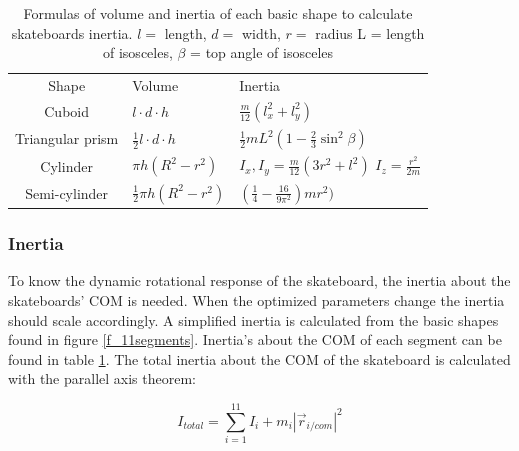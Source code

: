 \begin{table}
\begin{center}
\caption[Inertia]{Formulas of volume and inertia of each basic shape to calculate skateboards inertia. $l=$ length, $d=$ width, $r=$ radius L = length of isosceles, $\beta$ = top angle of isosceles}
\label{t_volume_inert}
\begin{tabular}{c l p{1.06in}}
& & \\ %
\hline
Shape & Volume & Inertia \\
\hline
Cuboid           & $l\cdot d\cdot h$              & $\frac{m}{12} (l_x^2+l_y^2)$ \\
Triangular prism & $\frac{1}{2} l\cdot d\cdot h$  &  $\frac{1}{2} m L^2\left(1-\frac{2}{3} \sin ^2 \beta\right)$ \cite{morin_introduction_2008}\\
Cylinder         & $\pi h (R^2-r^2)$                        &  $I_{x},I_{y} = \frac{m}{12} (3 r^2 + l^2)$ $I_{z} = \frac{r^2}{2 m} $ \\
Semi-cylinder    & $\frac{1}{2}\pi h (R^2-r^2)$             &  $(\frac{1}{4}-\frac{16}{9 \pi^2}) m r^2)$ \\
\hline

\end{tabular}

\end{center}
\end{table}


\subsubsection{Inertia}\label{ss_inertia}
\noindent To know the dynamic rotational response of the skateboard, the inertia about the skateboards' COM is needed. When the optimized parameters change the inertia should scale accordingly. A simplified inertia is calculated from the basic shapes found in figure \ref{f_11segments}. Inertia's about the COM of each segment can be found in table \ref{t_volume_inert}. The total inertia about the COM of the skateboard is calculated with the parallel axis theorem:

\begin{equation}
    I_{total} = \sum_{i=1}^{11} I_i + m_i  |\vec r_{i/com}| ^2
\end{equation}

